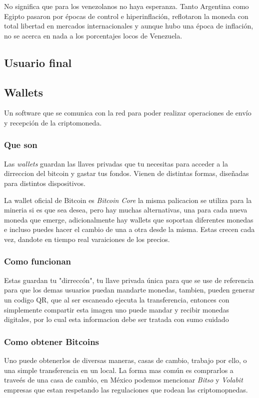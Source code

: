 \documentclass[12pt,letterpaper]{article}
\begin{document}
No significa que para los venezolanos no haya esperanza. Tanto Argentina como Egipto pasaron por épocas de control e hiperinflación, reflotaron la moneda con total libertad en mercados internacionales y aunque hubo una época de inflación, no se acerca en nada a los porcentajes locos de Venezuela.
        \subsection*{Usuario final}

            \subsection*{Wallets}
Un software que se comunica con la red para poder realizar operaciones de env\'io y recepci\'on de la criptomoneda.
                \subsubsection*{Que son}
                Las \textit{wallets} guardan las llaves privadas que tu necesitas para acceder a la dirreccion del bitcoin y gastar tus fondos. Vienen de distintas formas, dise\~nadas para distintos dispositivos.
                
                La wallet oficial de Bitcoin es \textit{Bitcoin Core} la misma palicacion se utiliza para la mineria si es que sea desea, pero hay muchas alternativas, una para cada nueva moneda que emerge, adicionalmente hay wallets que soportan diferentes monedas e incluso puedes hacer el cambio de una a otra desde la misma. Estas crecen cada vez, dandote en tiempo real varaiciones de los precios.
                \subsubsection*{Como funcionan}
				Estas guardan tu "dirrecc\'on", tu llave privada \'unica para que se use de referencia para que los demas usuarios puedan mandarte monedas, tambien, pueden generar un codigo QR, que al ser escaneado ejecuta la transferencia, entonces con simplemente compartir esta imagen uno puede mandar y recibir monedas digitales, por lo cual esta informacion debe ser tratada con sumo cuidado                                
            \subsubsection*{Como obtener Bitcoins}
	Uno puede obtenerlos de diversas maneras, casas de cambio, trabajo por ello, o una simple transferencia en un local. La forma mas com\'un es comprarlos a trave\'es de una casa de cambio, en M\'exico podemos mencionar \textit{Bitso} y \textit{Volabit} empresas que estan respetando las regulaciones que rodean las criptomopnedas.
	
\end{document}
